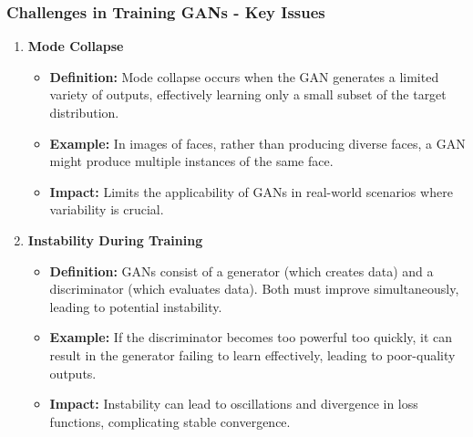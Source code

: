 \documentclass[aspectratio=169]{beamer}
\begin{document}
\begin{frame}[fragile]
    \frametitle{Challenges in Training GANs - Key Issues}
    \begin{enumerate}
        \item \textbf{Mode Collapse}
        \begin{itemize}
            \item \textbf{Definition:} Mode collapse occurs when the GAN generates a limited variety of outputs, effectively learning only a small subset of the target distribution.
            \item \textbf{Example:} In images of faces, rather than producing diverse faces, a GAN might produce multiple instances of the same face.
            \item \textbf{Impact:} Limits the applicability of GANs in real-world scenarios where variability is crucial.
        \end{itemize}
        
        \item \textbf{Instability During Training}
        \begin{itemize}
            \item \textbf{Definition:} GANs consist of a generator (which creates data) and a discriminator (which evaluates data). Both must improve simultaneously, leading to potential instability.
            \item \textbf{Example:} If the discriminator becomes too powerful too quickly, it can result in the generator failing to learn effectively, leading to poor-quality outputs.
            \item \textbf{Impact:} Instability can lead to oscillations and divergence in loss functions, complicating stable convergence.
        \end{itemize}
    \end{enumerate}
\end{frame}
\end{document}
